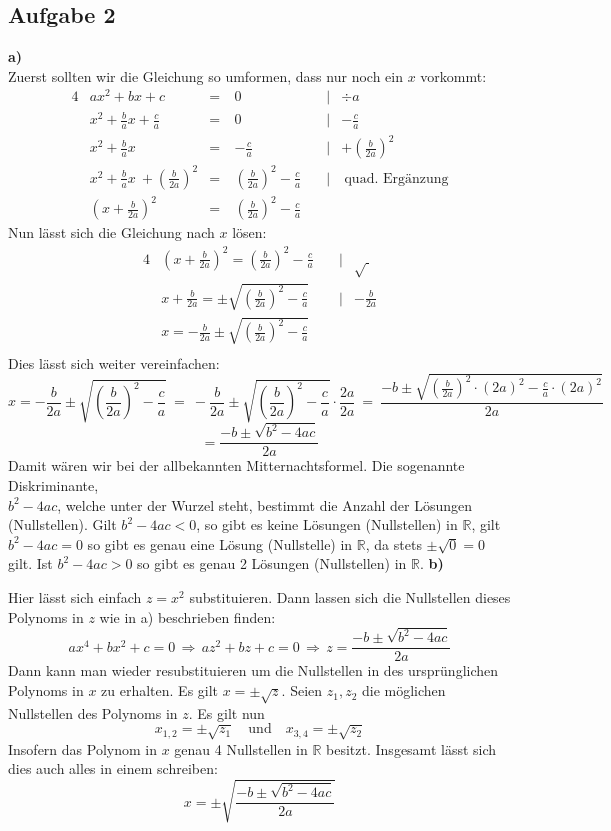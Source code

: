 \documentclass[a4paper,graphics,11pt]{article}
\newcommand{\aufgabe}[1]{\subsection*{Aufgabe #1}}
\begin{document}
\newpage
\aufgabe{2}
\textbf{a)}\\[5pt]
Zuerst sollten wir die Gleichung so umformen, dass nur noch ein $x$ vorkommt:
\begin{alignat*}{4}
    &ax^2+bx+c\ &=\ & 0 &|&\div a\\[2pt]
    &x^2+\frac{b}{a}x + \frac{c}{a}\ &=\ & 0 \quad &|& - \frac{c}{a}\\[2pt]
    &x^2+\frac{b}{a}x\ &=\ & -\frac{c}{a}&|& + \left(\frac{b}{2a}\right)^2\\[2pt]
    &x^2+\frac{b}{a}x\ + \left(\frac{b}{2a}\right)^2 &=\ & \left(\frac{b}{2a}\right)^2-\frac{c}{a}\quad&|&\ \text{quad. Ergänzung}\\[2pt]
    &\left(x+ \frac{b}{2a}\right)^2&=\ & \left(\frac{b}{2a}\right)^2-\frac{c}{a}\quad&&
\end{alignat*}
Nun lässt sich die Gleichung nach $x$ lösen:
\begin{alignat*}{4}
    &\left(x+\frac{b}{2a}\right)^2 = \left(\frac{b}{2a}\right)^2 - \frac{c}{a}\quad&|& \sqrt{\ }\\[2pt]
    &x+\frac{b}{2a} = \pm\sqrt{\left(\frac{b}{2a}\right)^2 - \frac{c}{a}}\quad&|& - \frac{b}{2a}\\[2pt]
    &x = -\frac{b}{2a}\pm\sqrt{\left(\frac{b}{2a}\right)^2 - \frac{c}{a}} \\[2pt]
\end{alignat*}
Dies lässt sich weiter vereinfachen:
$$
    x = -\frac{b}{2a} \pm \sqrt{\left(\frac{b}{2a}\right)^2 -\frac{c}{a}}
    \ =\ -\frac{b}{2a} \pm \sqrt{\left(\frac{b}{2a}\right)^2-\frac{c}{a}} \cdot \frac{2a}{2a}
    \ =\ \frac{-b\pm \sqrt{\left(\frac{b}{2a}\right)^2\cdot (2a)^2-\frac{c}{a}\cdot (2a)^2}}{2a}
$$$$
    = \frac{-b\pm \sqrt{b^2-4ac}}{2a}
$$
Damit wären wir bei der allbekannten Mitternachtsformel. Die sogenannte Diskriminante,\\
$b^2-4ac$, welche unter der Wurzel steht, bestimmt die Anzahl der Lösungen (Nullstellen).
Gilt $b^2-4ac < 0$, so gibt es keine Lösungen (Nullstellen) in $\mathbb{R}$, gilt $b^2-4ac = 0$ so
gibt es genau eine Lösung (Nullstelle) in $\mathbb{R}$, da stets $\pm\sqrt{0}= 0$ gilt. Ist $b^2-4ac > 0$ so gibt
es genau 2 Lösungen (Nullstellen) in $\mathbb{R}$.
\newpage
\textbf{b)}

Hier lässt sich einfach $z = x^2$ substituieren. Dann lassen sich die Nullstellen dieses
Polynoms in $z$ wie in a) beschrieben finden:
$$
    ax^4+bx^2+c = 0
    \,\Longrightarrow\, az^2+bz+c = 0
    \,\Longrightarrow\, z = \frac{-b \pm \sqrt{b^2-4ac}}{2a}
$$ 
Dann kann man wieder resubstituieren um die Nullstellen in des ursprünglichen Polynoms
in $x$ zu erhalten. Es gilt $x = \pm \sqrt{z}$. Seien $z_1, z_2$ die möglichen Nullstellen
des Polynoms in $z$. Es gilt nun
$$
    x_{1,2} = \pm\sqrt{z_1}\quad\text{und}\quad x_{3,4} = \pm \sqrt{z_2}
$$
Insofern das Polynom in $x$ genau 4 Nullstellen in $\mathbb{R}$ besitzt.
Insgesamt lässt sich dies auch alles in einem schreiben:
$$
    x = \pm\sqrt{\frac{-b\pm \sqrt{b^2-4ac}}{2a}}
$$
\end{document}
